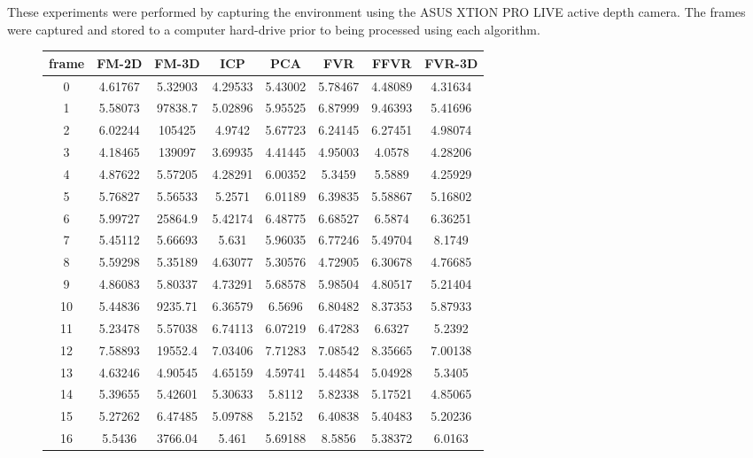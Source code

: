 These experiments were performed by capturing the environment using the ASUS XTION PRO LIVE active depth camera. The frames were captured and stored to a computer hard-drive prior to being processed using each algorithm. \\



\begin{figure}
\centering
\begin{tabular}{cccccccc}
\hline
\textbf{frame} & \textbf{FM-2D} & \textbf{FM-3D} & \textbf{ICP} & \textbf{PCA} & \textbf{FVR} & \textbf{FFVR} & \textbf{FVR-3D}
\\ \hline
0 & 4.61767 & 5.32903 & 4.29533 & 5.43002 & 5.78467 & 4.48089 & 4.31634\\
1 & 5.58073 & 97838.7 & 5.02896 & 5.95525 & 6.87999 & 9.46393 & 5.41696\\
2 & 6.02244 & 105425 & 4.9742 & 5.67723 & 6.24145 & 6.27451 & 4.98074\\
3 & 4.18465 & 139097 & 3.69935 & 4.41445 & 4.95003 & 4.0578 & 4.28206\\
4 & 4.87622 & 5.57205 & 4.28291 & 6.00352 & 5.3459 & 5.5889 & 4.25929\\
5 & 5.76827 & 5.56533 & 5.2571 & 6.01189 & 6.39835 & 5.58867 & 5.16802\\
6 & 5.99727 & 25864.9 & 5.42174 & 6.48775 & 6.68527 & 6.5874 & 6.36251\\
7 & 5.45112 & 5.66693 & 5.631 & 5.96035 & 6.77246 & 5.49704 & 8.1749\\
8 & 5.59298 & 5.35189 & 4.63077 & 5.30576 & 4.72905 & 6.30678 & 4.76685\\
9 & 4.86083 & 5.80337 & 4.73291 & 5.68578 & 5.98504 & 4.80517 & 5.21404\\
10 & 5.44836 & 9235.71 & 6.36579 & 6.5696 & 6.80482 & 8.37353 & 5.87933\\
11 & 5.23478 & 5.57038 & 6.74113 & 6.07219 & 6.47283 & 6.6327 & 5.2392\\
12 & 7.58893 & 19552.4 & 7.03406 & 7.71283 & 7.08542 & 8.35665 & 7.00138\\
13 & 4.63246 & 4.90545 & 4.65159 & 4.59741 & 5.44854 & 5.04928 & 5.3405\\
14 & 5.39655 & 5.42601 & 5.30633 & 5.8112 & 5.82338 & 5.17521 & 4.85065\\
15 & 5.27262 & 6.47485 & 5.09788 & 5.2152 & 6.40838 & 5.40483 & 5.20236\\
16 & 5.5436 & 3766.04 & 5.461 & 5.69188 & 8.5856 & 5.38372 & 6.0163\\

\end{tabular}
\end{figure}
